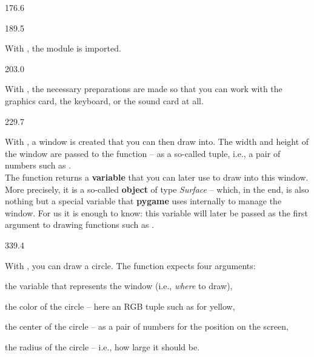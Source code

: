 \documentclass{aslab}
\begin{document}
\begin{region}{176.6}
\end{region}

\begin{region}[pitch=13.5]{189.5}
\begin{dashlist}
\item With , the module  is imported.
\end{dashlist}
\end{region}

\begin{region}[pitch=13.9]{203.0}
\begin{dashlist}
\item With , the necessary preparations are made so
  that you can work with the graphics card, the keyboard, or the sound card
  at all.
\end{dashlist}
\end{region}

\begin{region}[pitch=13.84]{229.7}
\begin{dashlist}
\item With , a window is created that you can
  then draw into. The width and height of the window are passed to the
  function -- as a so-called tuple, i.e., a pair of numbers such as
  .\\
  The function returns a \textbf{variable} that you can later use to draw
  into this window. More precisely, it is a so-called \textbf{object} of
  type \emph{Surface} -- which, in the end, is also nothing but a special
  variable that \textbf{pygame} uses internally to manage the window. For
  us it is enough to know: this variable will later be passed as the first
  argument to drawing functions such as .
\end{dashlist}
\end{region}

\begin{region}[pitch=13.56]{339.4}
\begin{dashlist}
\item With , you can draw a circle. The function
  expects four arguments:
  \begin{dashlist}
  \item the variable that represents the window (i.e., \emph{where} to
    draw),
  \item the color of the circle -- here an RGB tuple such as
     for yellow,
  \item the center of the circle -- as a pair of numbers  for
    the position on the screen,
  \item the radius of the circle -- i.e., how large it should be.
  \end{dashlist}
\end{dashlist}
\end{region}
\end{document}
